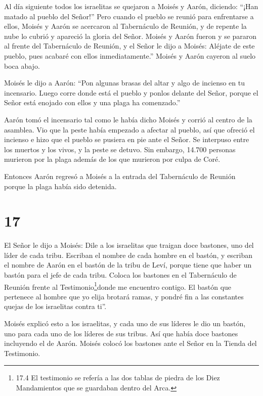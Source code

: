  Al día siguiente todos los israelitas se quejaron a Moisés
y Aarón, diciendo: ``¡Han matado al pueblo del Señor!'' 
Pero cuando el pueblo se reunió para enfrentarse a ellos, Moisés y Aarón
se acercaron al Tabernáculo de Reunión, y de repente la nube lo cubrió y
apareció la gloria del Señor.  Moisés y Aarón fueron y se
pararon al frente del Tabernáculo de Reunión,  y el Señor
le dijo a Moisés:  Aléjate de este pueblo, pues acabaré con
ellos inmediatamente.'' Moisés y Aarón cayeron al suelo boca abajo.

 Moisés le dijo a Aarón: ``Pon algunas brasas del altar y
algo de incienso en tu incensario. Luego corre donde está el pueblo y
ponlos delante del Señor, porque el Señor está enojado con ellos y una
plaga ha comenzado.''

 Aarón tomó el incensario tal como le había dicho Moisés y
corrió al centro de la asamblea. Vio que la peste había empezado a
afectar al pueblo, así que ofreció el incienso e hizo que el pueblo se
pusiera en pie ante el Señor.  Se interpuso entre los
muertos y los vivos, y la peste se detuvo.  Sin embargo,
14.700 personas murieron por la plaga además de los que murieron por
culpa de Coré.

 Entonces Aarón regresó a Moisés a la entrada del
Tabernáculo de Reunión porque la plaga había sido detenida.

\hypertarget{section-16}{%
\section{17}\label{section-16}}

 El Señor le dijo a Moisés:  Dile a los
israelitas que traigan doce bastones, uno del líder de cada tribu.
Escriban el nombre de cada hombre en el bastón,  y escriban
el nombre de Aarón en el bastón de la tribu de Leví, porque tiene que
haber un bastón para el jefe de cada tribu.  Coloca los
bastones en el Tabernáculo de Reunión frente al
Testimonio\footnote{17.4 El testimonio se refería a las dos tablas de
  piedra de los Diez Mandamientos que se guardaban dentro del Arca.}donde
me encuentro contigo.  El bastón que pertenece al hombre que
yo elija brotará ramas, y pondré fin a las constantes quejas de los
israelitas contra ti''.

 Moisés explicó esto a los israelitas, y cada uno de sus
líderes le dio un bastón, uno para cada uno de los líderes de sus
tribus. Así que había doce bastones incluyendo el de Aarón. 
Moisés colocó los bastones ante el Señor en la Tienda del Testimonio.

